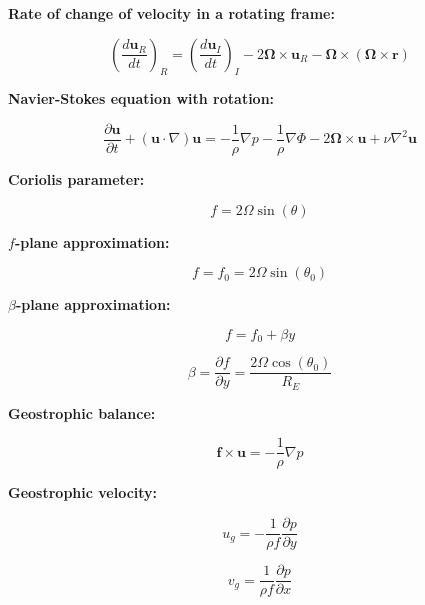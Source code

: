 \documentclass[12pt]{article}
\numberwithin{equation}{section}
\numberwithin{figure}{section}
\numberwithin{table}{section}
\begin{document}
\textbf{Rate of change of velocity in a rotating frame:}

\begin{equation}
  \left( \frac{d \mathbf{u}_R}{dt} \right)_R =
  \left( \frac{d \mathbf{u}_I}{dt} \right)_I -
  2 \mathbf{\Omega} \times \mathbf{u}_R -
  \mathbf{\Omega} \times \left( \mathbf{\Omega} \times \mathbf{r} \right)
\end{equation}

\textbf{Navier-Stokes equation with rotation:}

\begin{equation}
  \frac{\partial \mathbf{u}}{\partial t} +
  \left( \mathbf{u} \cdot \nabla \right) \mathbf{u} =
  - \frac{1}{\rho} \nabla p
  - \frac{1}{\rho} \nabla \Phi
  - 2 \mathbf{\Omega} \times \mathbf{u}
  + \nu \nabla^2 \mathbf{u}
\end{equation}

\textbf{Coriolis parameter:}

\begin{equation}
  f = 2 \Omega \sin(\theta)
\end{equation}

\textbf{$f$-plane approximation:}

\begin{equation}
  f = f_0 = 2 \Omega \sin(\theta_0)
\end{equation}

\textbf{$\beta$-plane approximation:}

\begin{equation}
  f = f_0 + \beta y
\end{equation}

\begin{equation}
  \beta = \frac{\partial f}{\partial y} = \frac{2\Omega\cos(\theta_0)}{R_E}
\end{equation}

\textbf{Geostrophic balance:}

\begin{equation}
  \mathbf{f} \times \mathbf{u} = - \frac{1}{\rho} \nabla p
\end{equation}

\textbf{Geostrophic velocity:}

\begin{equation}
  u_g = - \frac{1}{\rho f} \frac{\partial p}{\partial y}
\end{equation}

\begin{equation}
  v_g = \frac{1}{\rho f} \frac{\partial p}{\partial x}
\end{equation}
\end{document}
